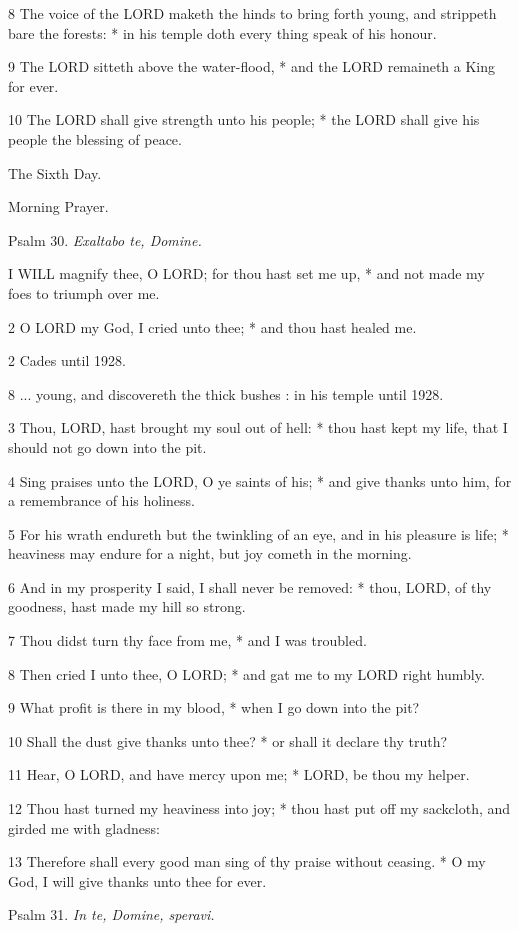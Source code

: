 8 The voice of the LORD maketh
the hinds to bring forth young, and strippeth bare the forests: * in his
temple doth every thing speak of his honour.

9 The LORD sitteth above the
water-flood, * and the LORD remaineth a King for
ever.

10 The LORD shall give strength
unto his people; * the LORD shall give his people
the blessing of peace.

The
Sixth Day.

Morning
Prayer.

Psalm
30. \emph{Exaltabo te, Domine.}

I
WILL magnify thee, O LORD; for thou hast set me
up, * and not made my foes to triumph over me.

2 O LORD my God, I cried unto
thee; * and thou hast healed me.

2 Cades until
1928.

8 ... young, and discovereth the thick bushes : in
his temple until
1928.

3 Thou, LORD, hast brought my
soul out of hell: * thou hast kept my life, that I should not go down
into the pit.

4 Sing praises unto the LORD,
O ye saints of his; * and give thanks unto him, for a remembrance of his
holiness.

5 For his wrath endureth but the twinkling of an eye,
and in his pleasure is life; * heaviness may endure for a night, but joy
cometh in the morning.

6 And in my prosperity I said, I shall never be removed:
* thou, LORD, of thy goodness, hast made my hill
so strong.

7 Thou didst turn thy face from me, * and I was troubled.

8 Then cried I unto thee, O LORD;
* and gat me to my LORD right humbly.

9 What profit is there in my blood, * when I go down
into the pit?

10 Shall the dust give thanks unto thee? * or shall
it declare thy truth?

11 Hear, O LORD, and have mercy
upon me; * LORD, be thou my helper.

12 Thou hast turned my heaviness into joy; * thou hast
put off my sackcloth, and girded me with gladness:

13 Therefore shall every good man sing of thy praise
without ceasing. * O my God, I will give thanks unto thee for ever.

Psalm
31. \emph{In te, Domine, speravi.}

